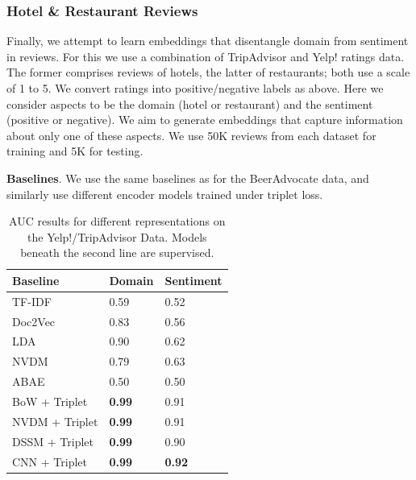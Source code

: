 \documentclass[11pt,a4paper]{article}
\begin{document}
\subsubsection{Hotel \& Restaurant Reviews}

Finally, we attempt to learn embeddings that disentangle domain from sentiment in reviews. For this we use a combination of TripAdvisor and Yelp! ratings data. The former comprises reviews of hotels, the latter of restaurants; both use a scale of 1 to 5. We convert ratings into positive/negative labels as above. Here we consider aspects to be the domain (hotel or restaurant) and the sentiment (positive or negative). We aim to generate embeddings that capture information about only one of these aspects. We use 50K reviews from each dataset for training and 5K for testing. 

\vspace{.2em}
\noindent \textbf{Baselines}. We use the same baselines as for the BeerAdvocate data, and similarly use different encoder models trained under triplet loss.

\begin{table}
\footnotesize
    \centering
    \begin{tabularx}{\columnwidth}{l X X}
     Baseline & Domain & Sentiment  \\
    \hline
    TF-IDF & 0.59 & 0.52   \\
    Doc2Vec & 0.83 & 0.56 \\
    LDA & 0.90 & 0.62 \\
    NVDM & 0.79 & 0.63  \\
    ABAE & 0.50 & 0.50 \\
    \hline
    BoW + Triplet & \textbf{0.99} & 0.91 \\
    NVDM + Triplet & \textbf{0.99} & 0.91 \\
    DSSM + Triplet &  \textbf{0.99} & 0.90 \\
    CNN + Triplet & \textbf{0.99} & \textbf{0.92}  \\
    \end{tabularx}
    \caption{AUC results for different representations on the Yelp!/TripAdvisor Data. Models beneath the second line are supervised.}
    \label{table:foodauc}
\end{table}
\end{document}
